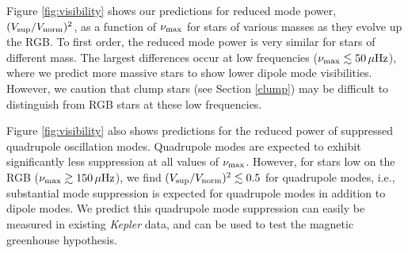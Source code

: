 Figure \ref{fig:visibility} shows our predictions for reduced mode power, $(V_{\rm sup}/V_{\rm norm})^2$, as a function of $\nu_{\rm max}$ for stars of various masses as they evolve up the RGB. To first order, the reduced mode power is very similar for stars of different mass. The largest differences occur at low frequencies ($\nu_{\rm max} \lesssim 50 \, \mu {\rm Hz}$), where we predict more massive stars to show lower dipole mode visibilities. However, we caution that clump stars (see Section \ref{clump}) may be difficult to distinguish from RGB stars at these low frequencies.

Figure \ref{fig:visibility} also shows predictions for the reduced power of suppressed quadrupole oscillation modes. Quadrupole modes are expected to exhibit significantly less suppression at all values of $\nu_{\rm max}$. However, for stars low on the RGB ($\nu_{\rm max} \gtrsim 150 \, \mu {\rm Hz}$), we find $(V_{\rm sup}/V_{\rm norm})^2 \lesssim 0.5 $ for quadrupole modes, i.e., substantial mode suppression is expected for quadrupole modes in addition to dipole modes. We predict this quadrupole mode suppression can easily be measured in existing {\it Kepler} data, and can be used to test the magnetic greenhouse hypothesis. 
  
  
  
  
  